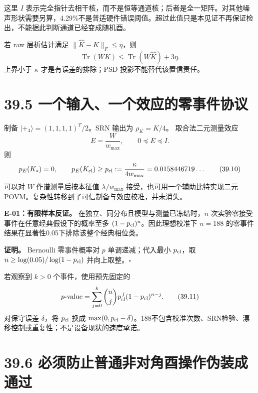 \documentclass[
  11pt,
  oneside]{book}
\begin{document}
这里 \(I\)
表示完全指针去相干核，而不是恒等通道核；后者是全一矩阵。对其他噪声形状需要另算，4.29\%不是普适硬件错误阈值。超过此值只是本见证不再保证检出，不能据此判断通道已经变成随机酉。

若 raw 层析估计满足 \(\|\widehat K-K\|_F\le\eta\)，则 \[
\operatorname{Tr}(WK)\le \operatorname{Tr}(W\widehat K)+3\eta.
\] 上界小于 \(\kappa\) 才是有误差的排除；PSD 投影不能替代该置信责任。

\hypertarget{ux4e00ux4e2aux8f93ux5165ux4e00ux4e2aux6548ux5e94ux7684ux96f6ux4e8bux4ef6ux534fux8bae}{%
\section{39.5
一个输入、一个效应的零事件协议}\label{ux4e00ux4e2aux8f93ux5165ux4e00ux4e2aux6548ux5e94ux7684ux96f6ux4e8bux4ef6ux534fux8bae}}

制备 \(|+\!_4\rangle=(1,1,1,1)^T/2\)。SRN 输出为 \(\rho_K=K/4\)。
取合法二元测量效应 \[
E=\frac{W}{w_{\max}},\qquad 0\preceq E\preceq I.
\tag{39.9}
\] 则 \[
p_E(K_*)=0,\qquad
p_E(K_{\rm cl})\ge
p_{\rm cl}:=\frac{\kappa}{4w_{\max}}
=0.0158446719\ldots
\tag{39.10}
\] 可以对 \(W\) 作谱测量后按本征值 \(\lambda/w_{\max}\)
接受，也可用一个辅助比特实现二元
POVM。复杂性转移到了可信制备与效应校准，并未消失。

\protect\hypertarget{e-01}{}{}

\textbf{E-01：有限样本反证。} 在独立、同分布且模型与测量已冻结时，\(n\)
次实验零接受事件在任意经典假设下的概率至多
\((1-p_{\rm cl})^n\)。因此理想校准下 \(n=188\)
的零事件结果在显著性0.05下排除该整个经典相位类。

\textbf{证明。} Bernoulli 零事件概率对 \(p\) 单调递减；代入最小
\(p_{\rm cl}\)，取 \(n\ge\log(0.05)/\log(1-p_{\rm cl})\)
并向上取整。\(\square\)

若观察到 \(k>0\) 个事件，使用预先固定的 \[
p\text{-value}=\sum_{j=0}^k{n\choose j}p_{\rm cl}^{\,j}(1-p_{\rm cl})^{n-j}.
\tag{39.11}
\] 对保守误差 \(\delta\)，将 \(p_{\rm cl}\) 换成
\(\max(0,p_{\rm cl}-\delta)\)。188不包含校准次数、SRN检验、漂移控制或重复性；不是设备现状的速度承诺。

\hypertarget{ux5fc5ux987bux9632ux6b62ux666eux901aux975eux5bf9ux89d2ux9149ux64cdux4f5cux4f2aux88c5ux6210ux901aux8fc7}{%
\section{39.6
必须防止普通非对角酉操作伪装成通过}\label{ux5fc5ux987bux9632ux6b62ux666eux901aux975eux5bf9ux89d2ux9149ux64cdux4f5cux4f2aux88c5ux6210ux901aux8fc7}}
\end{document}
